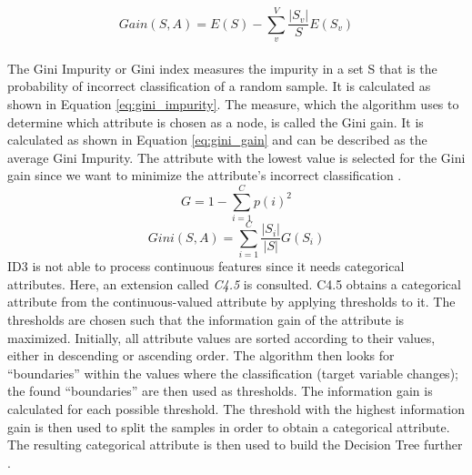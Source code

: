 \begin{equation}
 Gain(S, A) = E(S) - \sum_{v}^{V} \frac{|S_v|}{S} E(S_v)
 \label{eq:gain}
\end{equation}
\\
The Gini Impurity or Gini index measures the impurity in a set S that is the 
probability of incorrect classification of a random sample. It is calculated 
as shown in Equation \ref{eq:gini_impurity}. The measure, which the algorithm 
uses to determine which attribute is chosen as a node, is called the Gini gain. 
It is calculated as shown in Equation \ref{eq:gini_gain} and can be 
described as the average Gini Impurity. The attribute with the lowest value is 
selected for the Gini gain since we want to minimize the attribute's incorrect 
classification \cite{RN171}.
\begin{equation}
 G = 1 - \sum_{i=1}^C p(i)^2
 \label{eq:gini_impurity}
\end{equation}
\begin{equation}
 Gini(S, A) = \sum_{i=1}^C \frac{|S_i|}{|S|} G(S_i)
 \label{eq:gini_gain}
\end{equation}
ID3 is not able to process continuous features since it needs 
categorical attributes. Here, an extension called \textit{C4.5} is consulted. 
C4.5 obtains a categorical attribute from the continuous-valued attribute by 
applying thresholds to it. The thresholds are chosen such that the information 
gain of the attribute is maximized. Initially, all attribute values are sorted 
according to their values, either in descending or ascending order. The 
algorithm then looks for ``boundaries'' within the values where the 
classification (target variable changes); the found ``boundaries'' are then used 
as thresholds. The information gain is calculated for each possible threshold. 
The threshold with the highest information gain is then used to split the 
samples in order to obtain a categorical attribute. The resulting categorical 
attribute is then used to build the Decision Tree further \cite{RN209, RN208}.
